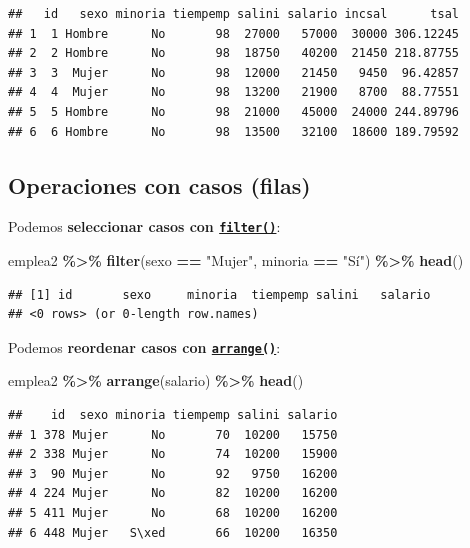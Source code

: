 \documentclass[
]{book}
\newenvironment{Shaded}{\begin{snugshade}}{\end{snugshade}}
\newcommand{\FunctionTok}[1]{\textcolor[rgb]{0.13,0.29,0.53}{\textbf{#1}}}
\newcommand{\NormalTok}[1]{#1}
\newcommand{\SpecialCharTok}[1]{\textcolor[rgb]{0.81,0.36,0.00}{\textbf{#1}}}
\newcommand{\StringTok}[1]{\textcolor[rgb]{0.31,0.60,0.02}{#1}}
\begin{document}
\begin{verbatim}
##   id   sexo minoria tiempemp salini salario incsal      tsal
## 1  1 Hombre      No       98  27000   57000  30000 306.12245
## 2  2 Hombre      No       98  18750   40200  21450 218.87755
## 3  3  Mujer      No       98  12000   21450   9450  96.42857
## 4  4  Mujer      No       98  13200   21900   8700  88.77551
## 5  5 Hombre      No       98  21000   45000  24000 244.89796
## 6  6 Hombre      No       98  13500   32100  18600 189.79592
\end{verbatim}

\subsection{Operaciones con casos (filas)}\label{dplyr-casos}

Podemos \textbf{seleccionar casos con \href{https://dplyr.tidyverse.org/reference/filter.html}{\texttt{filter()}}}:

\begin{Shaded}
\begin{Highlighting}[]
\NormalTok{emplea2 }\SpecialCharTok{\%\textgreater{}\%} \FunctionTok{filter}\NormalTok{(sexo }\SpecialCharTok{==} \StringTok{"Mujer"}\NormalTok{, minoria }\SpecialCharTok{==} \StringTok{"Sí"}\NormalTok{) }\SpecialCharTok{\%\textgreater{}\%} \FunctionTok{head}\NormalTok{()}
\end{Highlighting}
\end{Shaded}

\begin{verbatim}
## [1] id       sexo     minoria  tiempemp salini   salario 
## <0 rows> (or 0-length row.names)
\end{verbatim}

Podemos \textbf{reordenar casos con \href{https://dplyr.tidyverse.org/reference/arrange.html}{\texttt{arrange()}}}:

\begin{Shaded}
\begin{Highlighting}[]
\NormalTok{emplea2 }\SpecialCharTok{\%\textgreater{}\%} \FunctionTok{arrange}\NormalTok{(salario) }\SpecialCharTok{\%\textgreater{}\%} \FunctionTok{head}\NormalTok{()}
\end{Highlighting}
\end{Shaded}

\begin{verbatim}
##    id  sexo minoria tiempemp salini salario
## 1 378 Mujer      No       70  10200   15750
## 2 338 Mujer      No       74  10200   15900
## 3  90 Mujer      No       92   9750   16200
## 4 224 Mujer      No       82  10200   16200
## 5 411 Mujer      No       68  10200   16200
## 6 448 Mujer   S\xed       66  10200   16350
\end{verbatim}
\end{document}
